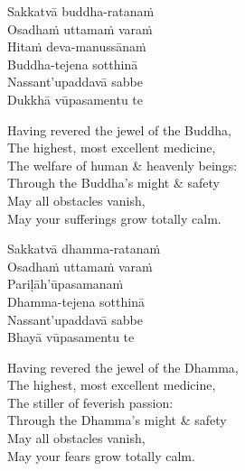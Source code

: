 \begin{pali-hang-continued}
  Sakkatvā buddha-ratanaṁ\\
  Osadhaṁ \ifdigital\makeatletter\hyperlink{endnote127-appendix}\makeatother\fi
uttamaṁ varaṁ\\
  Hitaṁ deva-manussānaṁ\\
  Buddha-tejena sotthinā\\
  Nassant'upaddavā sabbe\\
  Dukkhā vūpasamentu te
\end{pali-hang-continued}

\begin{english-verses}
  Having revered the jewel of the Buddha,\\
  The highest, most excellent medicine,\\
  The welfare of human \& heavenly beings:\\
  Through the Buddha's might \& safety\\
  May all obstacles vanish,\\
  May your sufferings grow totally calm.
\end{english-verses}

\ifninebythirteen\clearpage\fi

\begin{pali-hang-continued}
  Sakkatvā dhamma-ratanaṁ\\
  Osadhaṁ uttamaṁ varaṁ\\
  Pariḷāh'ūpasamanaṁ\\
  Dhamma-tejena sotthinā\\
  Nassant'upaddavā sabbe\\
  Bhayā vūpasamentu te
\end{pali-hang-continued}

  \ifbfive\clearpage\fi

\begin{english-verses}
  Having revered the jewel of the Dhamma,\\
  The highest, most excellent medicine,\\
  The stiller of feverish passion:\\
  Through the Dhamma's might \& safety\\
  May all obstacles vanish,\\
  May your fears grow totally calm.
\end{english-verses}

